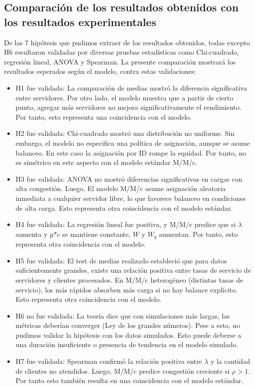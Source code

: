 \documentclass[12pt,a4paper]{article}
\begin{document}
\subsection{Comparación de los resultados obtenidos con los resultados experimentales}
De las 7 hipótesis que pudimos extraer de los resultados obtenidos, todas excepto H6 resultaron validadas por diversas
pruebas estadísticas como Chi-cuadrado, regresión lineal, ANOVA y Spearman. La presente comparación mostrará los resultados
esperados según el modelo, contra estas validaciones:
\begin{itemize}
\item H1 fue validada: La comparación de medias mostró la diferencia significativa entre servidores. Por otro lado, el modelo muestra
que a partir de cierto punto, agregar más servidores no mejora significativamente el rendimiento. Por tanto, esto representa una
coincidencia con el modelo.
\item H2 fue validada: Chi-cuadrado mostró una distribución no uniforme. Sin embargo, el modelo no especifica una política de 
asignación, aunque se asume balanceo. En este caso la asignación por ID rompe la equidad. Por tanto, no es simétrico en este
aspecto con el modelo estándar M/M/c.
\item H3 fue validada: ANOVA no mostró diferencias significativas en cargas con alta congestión. Luego, El modelo M/M/c asume 
asignación aleatoria inmediata a cualquier servidor libre, lo que favorece balanceo en condiciones de alta carga. Esto 
representa otra coincidencia con el modelo estándar.
\item H4 fue validada: La regresión lineal fue positiva, y M/M/c predice que si $\lambda$ aumenta y µ$*c$ se mantiene constante, $W$ y $W_q$ aumentan. Por tanto, esto representa otra coincidencia con el modelo.
\item H5 fue validada: El test de medias realizado estableció que para datos suficientemente grandes, existe una relación positiva
entre tasas de servicio de servidores y clientes procesados. En M/M/c heterogéneo (distintas tasas de servicio), los más rápidos
absorben más carga si no hay balance explícito. Esto representa otra coincidencia con el modelo.
\item H6 no fue validada: La teoría dice que con simulaciones más largas, las métricas deberían converger (Ley de los grandes números).
Pese a esto, no pudimos validar la hipótesis con los datos simulados. Esto puede deberse a una duración insuficiente o presencia 
de tendencia en el modelo simulado.
\item H7 fue validada: Spearman confirmó la relación positiva entre $\lambda$ y la cantidad de clientes no atendidos. Luego, M/M/c predice congestión creciente si $\rho>1$. Por tanto esto también resulta en una coincidencia con el modelo estándar.
\end{itemize}
\end{document}
